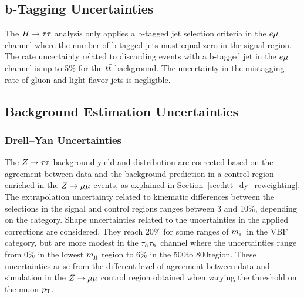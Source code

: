 \subsection{b-Tagging Uncertainties}
The $H\to\tau\tau$ analysis only applies a b-tagged jet selection criteria in the $e\mu$ channel where the number
of b-tagged jets must equal zero in the signal region. The rate uncertainty related to discarding events 
with a b-tagged jet in the $e\mu$ channel is up to 5\% for the $t\bar{t}$ background. The uncertainty 
in the mistagging rate of gluon and light-flavor jets is negligible.




\subsection{Background Estimation Uncertainties}
\subsubsection{Drell--Yan Uncertainties}
The $Z\to\tau\tau$ background yield and distribution are corrected based on the agreement between data and the 
background prediction in a control region enriched in the $Z\to\mu\mu$ events, as explained in 
Section~\ref{sec:htt_dy_reweighting}. The extrapolation uncertainty related to kinematic differences between the selections 
in the signal and control regions ranges between 3 and 10\%, depending
on the category. Shape uncertainties related to the uncertainties in the applied corrections are considered.
They reach 20\% for some ranges of $m_\mathrm{jj}$ in the VBF category, but are more modest in the $\tau_{h}\tau_{h}$ channel where
the uncertainties range from 0\% in the lowest $m_\mathrm{jj}$ region to 6\% in the 500\GeV to 800\GeV region.
These uncertainties arise from the different level of agreement between data and simulation in the 
$Z\to\mu\mu$ control region obtained when varying the threshold on the muon $p_\mathrm{T}$.


